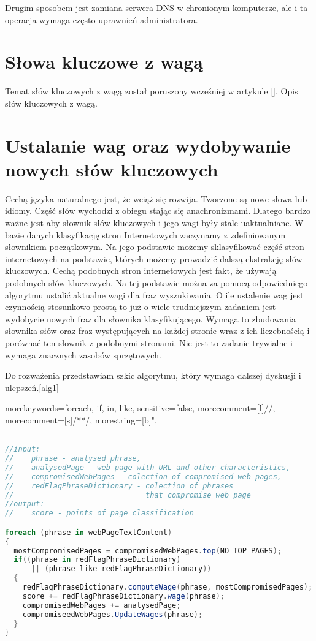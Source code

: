 \documentclass[10pt,twoside,a4paper]{article}
\begin{document}
Drugim sposobem jest zamiana serwera DNS w chronionym komputerze, ale i ta operacja wymaga często uprawnień administratora.
	
\section{Słowa kluczowe z wagą}
Temat słów kluczowych z wagą został poruszony wcześniej w artykule []. Opis słów kluczowych z wagą.

\section{Ustalanie wag oraz wydobywanie nowych słów kluczowych}
Cechą języka naturalnego jest, że wciąż się rozwija. Tworzone są nowe słowa lub idiomy. Część słów wychodzi z obiegu stając się anachronizmami. Dlatego bardzo ważne jest aby słownik słów kluczowych i jego wagi były stale uaktualniane. W bazie danych klasyfikację stron Internetowych zaczynamy z zdefiniowanym słownikiem początkowym. Na jego podstawie możemy sklasyfikować część stron internetowych na podstawie, których możemy prowadzić dalszą ekstrakcję słów kluczowych. Cechą podobnych stron internetowych jest fakt, że używają podobnych słów kluczowych. Na tej podstawie można za pomocą odpowiedniego algorytmu ustalić aktualne wagi dla fraz wyszukiwania. O ile ustalenie wag jest czynnością stosunkowo prostą to już o wiele trudniejszym zadaniem jest wydobycie nowych fraz dla słownika klasyfikującego. Wymaga to zbudowania słownika słów oraz fraz występujących na każdej stronie wraz z ich liczebnością i porównać ten słownik z podobnymi stronami. Nie jest to zadanie trywialne i wymaga znacznych zasobów sprzętowych.

Do rozważenia przedstawiam szkic algorytmu, który wymaga dalszej dyskusji i ulepszeń.[alg1]

%
 {morekeywords={foreach, if, in, like}, sensitive=false, morecomment=[l]{//}, morecomment=[s]{/*}{*/}, morestring=[b]", }
\lstset{
numbers=left, numberstyle=\tiny, stepnumber=1, numbersep=5pt
}
\begin{lstlisting}[title={Alg 1. Podstawowy algorytm klasyfikacji stron internetowych}, language=csharp, label=alg1] 

//input: 
//    phrase - analysed phrase, 
//    analysedPage - web page with URL and other characteristics, 
//    compromisedWebPages - colection of compromised web pages, 
//    redFlagPhraseDictionary - colection of phrases 
//                              that compromise web page
//output:
//    score - points of page classification

foreach (phrase in webPageTextContent)
{
  mostCompromisedPages = compromisedWebPages.top(NO_TOP_PAGES);
  if((phrase in redFlagPhraseDictionary) 
      || (phrase like redFlagPhraseDictionary))
  {
    redFlagPhraseDictionary.computeWage(phrase, mostCompromisedPages);
    score += redFlagPhraseDictionary.wage(phrase);
    compromisedWebPages += analysedPage;
    compromiseedWebPages.UpdateWages(phrase);
  }
}

\end{lstlisting}
\end{document}
